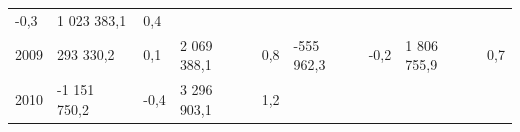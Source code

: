 \begin{longtable}[]{@{}lllllllll@{}}
\begin{minipage}[t]{0.06\columnwidth}
-0,3\strut
\end{minipage} & \begin{minipage}[t]{0.10\columnwidth}\raggedright
1 023 383,1\strut
\end{minipage} & \begin{minipage}[t]{0.06\columnwidth}\raggedright
0,4\strut
\end{minipage}\tabularnewline
\begin{minipage}[t]{0.05\columnwidth}\raggedright
2009\strut
\end{minipage} & \begin{minipage}[t]{0.10\columnwidth}\raggedright
293 330,2\strut
\end{minipage} & \begin{minipage}[t]{0.06\columnwidth}\raggedright
0,1\strut
\end{minipage} & \begin{minipage}[t]{0.16\columnwidth}\raggedright
2 069 388,1\strut
\end{minipage} & \begin{minipage}[t]{0.06\columnwidth}\raggedright
0,8\strut
\end{minipage} & \begin{minipage}[t]{0.12\columnwidth}\raggedright
-555 962,3\strut
\end{minipage} & \begin{minipage}[t]{0.06\columnwidth}\raggedright
-0,2\strut
\end{minipage} & \begin{minipage}[t]{0.10\columnwidth}\raggedright
1 806 755,9\strut
\end{minipage} & \begin{minipage}[t]{0.06\columnwidth}\raggedright
0,7\strut
\end{minipage}\tabularnewline
\begin{minipage}[t]{0.05\columnwidth}\raggedright
2010\strut
\end{minipage} & \begin{minipage}[t]{0.10\columnwidth}\raggedright
-1 151 750,2\strut
\end{minipage} & \begin{minipage}[t]{0.06\columnwidth}\raggedright
-0,4\strut
\end{minipage} & \begin{minipage}[t]{0.16\columnwidth}\raggedright
3 296 903,1\strut
\end{minipage} & \begin{minipage}[t]{0.06\columnwidth}\raggedright
1,2\strut

\end{minipage}
\end{longtable}
